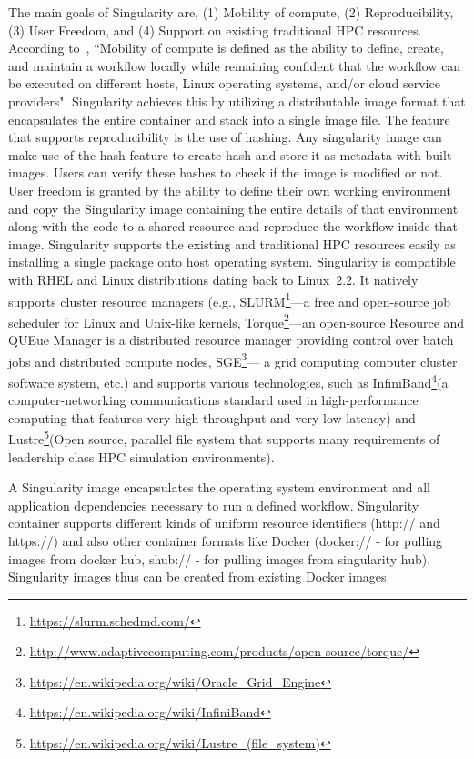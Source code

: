 The main goals of Singularity are, (1) Mobility of compute, (2) 
Reproducibility, (3) User Freedom, and (4) Support on existing traditional HPC 
resources. According to~\cite{10.1371/journal.pone.0177459}, ``Mobility 
of compute is defined as the ability to define, create, and maintain a 
workflow locally while remaining confident that the workflow can be 
executed on different hosts, Linux operating systems, and/or cloud 
service providers". Singularity achieves this by utilizing a 
distributable image format that encapsulates the entire container and 
stack into a single image file. The feature that supports 
reproducibility is the use of hashing. Any singularity image can make 
use of the hash feature to create hash and store it as metadata with 
built images. Users can verify these hashes to check if the image is 
modified or not. User freedom is granted by the ability to define their 
own working environment and copy the Singularity image containing the 
entire details of that environment along with the code to a shared 
resource and reproduce the workflow inside that image. Singularity 
supports the existing and traditional HPC resources easily as 
installing a single package onto host operating system. Singularity is 
compatible with RHEL and Linux distributions dating back to Linux~2.2. 
It natively supports cluster resource managers (e.g.,
SLURM\footnote{\url{https://slurm.schedmd.com/}}---a free and 
open-source job scheduler for Linux and Unix-like kernels, 
Torque\footnote{\url{http://www.adaptivecomputing.com/products/open-source/torque/}}---an open-source Resource and QUEue Manager is a distributed resource 
manager providing control over batch jobs and distributed compute 
nodes, 
SGE\footnote{\url{https://en.wikipedia.org/wiki/Oracle_Grid_Engine}}--- 
a grid computing computer cluster software system, etc.) and supports various technologies, such as 
InfiniBand\footnote{\url{https://en.wikipedia.org/wiki/InfiniBand}}(a
computer-networking communications standard used in high-performance 
computing that features very high throughput and very low latency) and 
Lustre\footnote{\url{https://en.wikipedia.org/wiki/Lustre_(file_system)}}(Open 
source, parallel file system that supports many requirements of 
leadership class HPC simulation environments).

A Singularity image encapsulates the operating system environment and 
all application dependencies necessary to run a defined workflow. 
Singularity container supports different kinds of uniform resource 
identifiers (http:// and https://) and also other container formats 
like Docker (docker:// - for pulling images from docker hub, shub:// - 
for pulling images from singularity hub). Singularity images thus can 
be created from existing Docker images.

